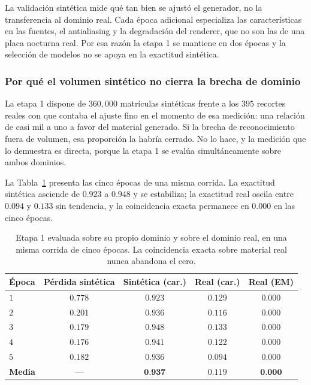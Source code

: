 La validación sintética mide qué tan bien se ajustó el generador, no la
transferencia al dominio real. Cada época adicional especializa las
características en las fuentes, el antialiasing y la degradación del renderer, que
no son las de una placa nocturna real. Por esa razón la etapa 1 se mantiene en dos
épocas y la selección de modelos no se apoya en la exactitud sintética.

\subsubsection{Por qué el volumen sintético no cierra la brecha de dominio}
\label{subsubsec:techo_sintetico}

La etapa 1 dispone de $360{,}000$ matrículas sintéticas frente a los $395$ recortes
reales con que contaba el ajuste fino en el momento de esa medición: una
relación de casi mil a uno a favor del material generado. Si la brecha de
reconocimiento fuera de volumen, esa proporción la habría cerrado. No lo hace, y
la medición que lo demuestra es directa, porque la etapa 1 se evalúa
simultáneamente sobre ambos dominios.

La Tabla~\ref{tab:etapa1_dominios} presenta las cinco épocas de una misma corrida.
La exactitud sintética asciende de $0{.}923$ a $0{.}948$ y se estabiliza; la
exactitud real oscila entre $0{.}094$ y $0{.}133$ sin tendencia, y la coincidencia
exacta permanece en $0{.}000$ en las cinco épocas.

\begin{table}[H]
    \centering
    \caption{Etapa 1 evaluada sobre su propio dominio y sobre el dominio real, en
    una misma corrida de cinco épocas. La coincidencia exacta sobre material real
    nunca abandona el cero.}
    \label{tab:etapa1_dominios}
    \begin{tabular}{lcccc}
        \toprule
        \textbf{Época} & \textbf{Pérdida sintética} &
        \textbf{Sintética (car.)} & \textbf{Real (car.)} & \textbf{Real (EM)} \\
        \midrule
        $1$ & $0{.}778$ & $0{.}923$ & $0{.}129$ & $0{.}000$ \\
        $2$ & $0{.}201$ & $0{.}936$ & $0{.}116$ & $0{.}000$ \\
        $3$ & $0{.}179$ & $0{.}948$ & $0{.}133$ & $0{.}000$ \\
        $4$ & $0{.}176$ & $0{.}941$ & $0{.}122$ & $0{.}000$ \\
        $5$ & $0{.}182$ & $0{.}936$ & $0{.}094$ & $0{.}000$ \\
        \midrule
        \textbf{Media} & --- & $\mathbf{0{.}937}$ & $0{.}119$ & $\mathbf{0{.}000}$ \\
        \bottomrule
    \end{tabular}
\end{table}

